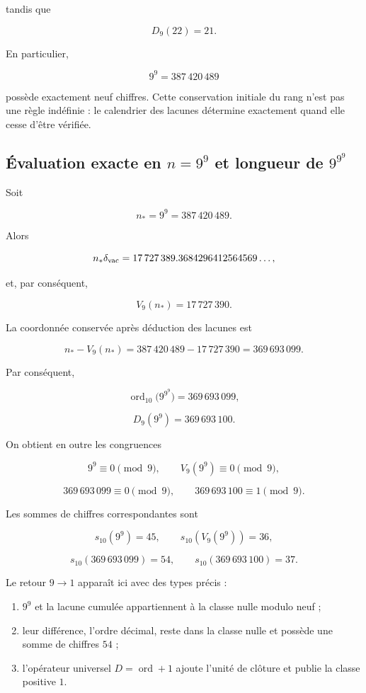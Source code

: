 tandis que

\[
D_9(22)=21.
\]

En particulier,

\[
9^9=387\,420\,489
\]

possède exactement neuf chiffres. Cette conservation initiale du rang n’est pas une règle indéfinie : le calendrier des lacunes détermine exactement quand elle cesse d’être vérifiée.

\subsection{Évaluation exacte en \(n=9^9\) et longueur de \(9^{9^9}\)}

Soit

\[
n_*=9^9=387\,420\,489.
\]

Alors

\[
n_*\delta_{\rm vac}
=17\,727\,389.3684296412564569\ldots,
\]

et, par conséquent,

\[
\boxed{V_9(n_*)=17\,727\,390}.
\]

La coordonnée conservée après déduction des lacunes est

\[
n_*-V_9(n_*)
=387\,420\,489-17\,727\,390
=369\,693\,099.
\]

Par conséquent,

\[
\boxed{\operatorname{ord}_{10}\bigl(9^{9^9}\bigr)=369\,693\,099},
\]

\[
\boxed{D_9(9^9)=369\,693\,100}.
\]

On obtient en outre les congruences

\[
9^9\equiv0\pmod9,\qquad
V_9(9^9)\equiv0\pmod9,
\]

\[
369\,693\,099\equiv0\pmod9,\qquad
369\,693\,100\equiv1\pmod9.
\]

Les sommes de chiffres correspondantes sont

\[
s_{10}(9^9)=45,\qquad
s_{10}(V_9(9^9))=36,
\]

\[
s_{10}(369\,693\,099)=54,\qquad
s_{10}(369\,693\,100)=37.
\]

Le retour \(9\to1\) apparaît ici avec des types précis :

\begin{enumerate}
\item \(9^9\) et la lacune cumulée appartiennent à la classe nulle modulo neuf ;
\item leur différence, l’ordre décimal, reste dans la classe nulle et possède une somme de chiffres \(54\) ;
\item l’opérateur universel \(D=\operatorname{ord}+1\) ajoute l’unité de clôture et publie la classe positive \(1\).
\end{enumerate}

